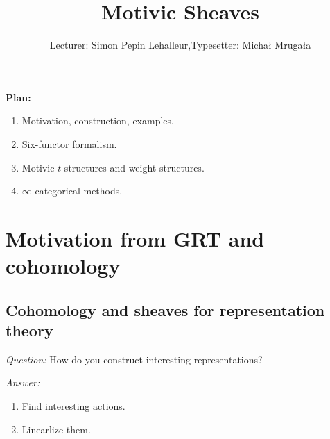 

\usepackage{mathtools}

\def\Cone{\operatorname{Cone}}
\def\Ch{\cat{Ch}}
\def\ft{^{\text{(f.t)}}}
\def\Sm{\cat{Sm}}
\DeclareMathOperator{\hocolim}{hocolim}
\def\Sing{\operatorname{Sing}}
\def\F{\bb{F}}
\def\Ga{\mathbb{G}_a}
\def\Gm{\mathbb{G}_m}
\def\Fr{\operatorname{Fr}}
\def\PSp{\operatorname{PSp}}
\def\Sp{\operatorname{Sp}}
\def\Ev{\operatorname{Ev}}
\def\Sus{\operatorname{Sus}}
\def\Et{\cat{Et}}
\def\Ind{\operatorname{Ind}}
\def\rank{\operatorname{rank}}
\def\Bl{\operatorname{Bl}}
\def\Sch{\cat{Sch}}
\def\kz{\mathfrak{z}}
\def\Chow{\operatorname{CH}}
\def\Sym{\operatorname{Sym}}
\def\kg{\mathfrak{g}}
\def\PrL{\operatorname{Pr}^L}
\def\1b{\mathbb{1}}
\def\car{\operatorname{char}}
\def\Repf{\cat{Rep}^{\text{f.d.}}}

\title{Motivic Sheaves}
\author{Lecturer: Simon Pepin Lehalleur,\quad Typesetter: Micha{\l} Mruga{\l}a}


\maketitle
\textbf{Plan:}
\begin{enumerate}[L1:]
	\item Motivation, construction, examples.
	\item Six-functor formalism.
	\item Motivic $t$-structures and weight structures.
	\item $\infty$-categorical methods.
\end{enumerate}
\section{Motivation from GRT and cohomology}
\subsection{Cohomology and sheaves for representation theory} \leavevmode


\emph{Question:} How do you construct interesting representations?

\emph{Answer:}
\begin{enumerate}[1)]
\item Find interesting actions.
\item Linearlize them.
\end{enumerate}

